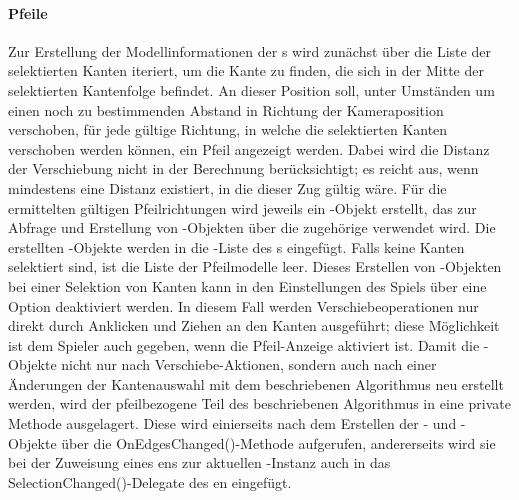 \paragraph{Pfeile}

Zur Erstellung der Modellinformationen der s wird zunächst über die Liste der selektierten Kanten iteriert, um die Kante zu finden, die sich in der Mitte der selektierten Kantenfolge befindet. An dieser Position soll, unter Umständen um einen noch zu bestimmenden Abstand in Richtung der Kameraposition verschoben, für jede gültige Richtung, in welche die selektierten Kanten verschoben werden können, ein Pfeil angezeigt werden. Dabei wird die Distanz der Verschiebung nicht in der Berechnung berücksichtigt; es reicht aus, wenn mindestens eine Distanz existiert, in die dieser Zug gültig wäre.
\newline\newline
Für die ermittelten gültigen Pfeilrichtungen wird jeweils ein -Objekt erstellt, das zur Abfrage und Erstellung von -Objekten über die zugehörige  verwendet wird. Die erstellten -Objekte werden in die -Liste des s eingefügt. Falls keine Kanten selektiert sind, ist die Liste der Pfeilmodelle leer.
\newline\newline
Dieses Erstellen von -Objekten bei einer Selektion von Kanten kann in den Einstellungen des Spiels über eine Option deaktiviert werden. In diesem Fall werden Verschiebeoperationen nur direkt durch Anklicken und Ziehen an den Kanten ausgeführt; diese Möglichkeit ist dem Spieler auch gegeben, wenn die Pfeil-Anzeige aktiviert ist.
\newline\newline
Damit die -Objekte nicht nur nach Verschiebe-Aktionen, sondern auch nach einer Änderungen der Kantenauswahl mit dem beschriebenen Algorithmus neu erstellt werden, wird der pfeilbezogene Teil des beschriebenen Algorithmus in eine private Methode ausgelagert. Diese wird einierseits nach dem Erstellen der - und -Objekte über die OnEdgesChanged()-Methode aufgerufen, andererseits wird sie bei der Zuweisung eines ens zur aktuellen -Instanz auch in das SelectionChanged()-Delegate des en eingefügt.